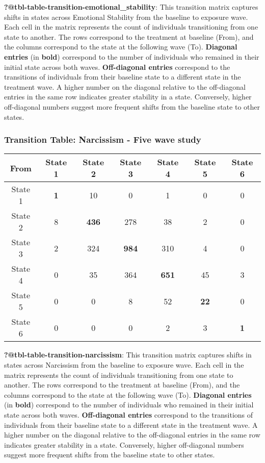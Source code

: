 \documentclass[
  singlecolumn]{article}
\begin{document}
\textbf{?@tbl-table-transition-emotional\_stability}: This transition
matrix captures shifts in states across Emotional Stability from the
baseline to exposure wave. Each cell in the matrix represents the count
of individuals transitioning from one state to another. The rows
correspond to the treatment at baseline (From), and the columns
correspond to the state at the following wave (To). \textbf{Diagonal
entries} (in \textbf{bold}) correspond to the number of individuals who
remained in their initial state across both waves. \textbf{Off-diagonal
entries} correspond to the transitions of individuals from their
baseline state to a different state in the treatment wave. A higher
number on the diagonal relative to the off-diagonal entries in the same
row indicates greater stability in a state. Conversely, higher
off-diagonal numbers suggest more frequent shifts from the baseline
state to other states.

\subsubsection{Transition Table: Narcissism - Five wave
study}\label{transition-table-narcissism---five-wave-study}

\begin{longtable}[]{@{}ccccccc@{}}
\toprule\noalign{}
From & State 1 & State 2 & State 3 & State 4 & State 5 & State 6 \\
\midrule\noalign{}
\endhead
\bottomrule\noalign{}
\endlastfoot
State 1 & \textbf{1} & 10 & 0 & 1 & 0 & 0 \\
State 2 & 8 & \textbf{436} & 278 & 38 & 2 & 0 \\
State 3 & 2 & 324 & \textbf{984} & 310 & 4 & 0 \\
State 4 & 0 & 35 & 364 & \textbf{651} & 45 & 3 \\
State 5 & 0 & 0 & 8 & 52 & \textbf{22} & 0 \\
State 6 & 0 & 0 & 0 & 2 & 3 & \textbf{1} \\
\end{longtable}

\textbf{?@tbl-table-transition-narcissism}: This transition matrix
captures shifts in states across Narcissism from the baseline to
exposure wave. Each cell in the matrix represents the count of
individuals transitioning from one state to another. The rows correspond
to the treatment at baseline (From), and the columns correspond to the
state at the following wave (To). \textbf{Diagonal entries} (in
\textbf{bold}) correspond to the number of individuals who remained in
their initial state across both waves. \textbf{Off-diagonal entries}
correspond to the transitions of individuals from their baseline state
to a different state in the treatment wave. A higher number on the
diagonal relative to the off-diagonal entries in the same row indicates
greater stability in a state. Conversely, higher off-diagonal numbers
suggest more frequent shifts from the baseline state to other states.
\end{document}
